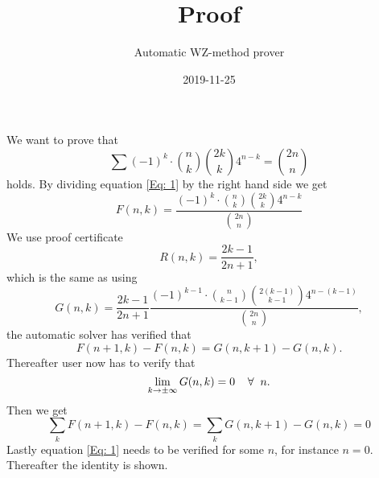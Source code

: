 \documentclass{article}
\title{Proof}
\author{Automatic WZ-method prover}
\date{2019-11-25}
\let\oldforall\forall
\renewcommand{\forall}{\hspace*{2mm}\oldforall\hspace*{1mm}}
\begin{document}
\maketitle
We want to prove that
\begin{equation}\label{Eq: 1}
\sum (-1)^k\cdot\binom{n}{k}\binom{2k}{k}4^{n-k}=\binom{2n}{n}
\end{equation}
holds. By dividing equation \ref{Eq: 1} by the right hand side we get
\begin{equation}
F(n,k)=\frac{(-1)^{k}\cdot\binom{n}{k}\binom{2k}{k}4^{n-k}}{\binom{2n}{n}}
\end{equation}
We use proof certificate
\begin{equation}
R(n,k)=\frac{2k-1}{2n+1},
\end{equation}
which is the same as using
\begin{equation}
G(n,k)=\frac{2k-1}{2n+1}\frac{(-1)^{k-1}\cdot\binom{n}{k-1}\binom{2(k-1)}{k-1}4^{n-(k-1)}}{\binom{2n}{n}},
\end{equation}
the automatic solver has  verified that
\begin{equation}\label{Eq: WZ1}
F(n+1,k)-F(n,k)=G(n,k+1)-G(n,k).
\end{equation}
Thereafter user now has to verify that
\begin{equation}
\lim_{k\to\pm\infty}G(n,k)=0\forall n.
\end{equation}
Then we get
\begin{equation}
\sum_k F(n+1,k)-F(n,k)=\sum_k G(n,k+1)-G(n,k)=0\end{equation}Lastly equation \ref{Eq: 1} needs to be verified for some $n$, for instance $n=0$. Thereafter the identity is shown.
\end{document}
